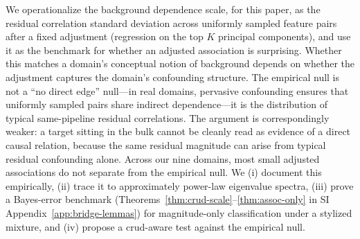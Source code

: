 We operationalize the background dependence scale, for this paper, as the residual correlation standard deviation across uniformly sampled feature pairs after a fixed adjustment (regression on the top $K$ principal components), and use it as the benchmark for whether an adjusted association is surprising. Whether this matches a domain's conceptual notion of background depends on whether the adjustment captures the domain's confounding structure. The empirical null is not a ``no direct edge'' null---in real domains, pervasive confounding ensures that uniformly sampled pairs share indirect dependence---it is the distribution of typical same-pipeline residual correlations. The argument is correspondingly weaker: a target sitting in the bulk cannot be cleanly read as evidence of a direct causal relation, because the same residual magnitude can arise from typical residual confounding alone. Across our nine domains, most small adjusted associations do not separate from the empirical null. We (i) document this empirically, (ii) trace it to approximately power-law eigenvalue spectra, (iii) prove a Bayes-error benchmark (Theorems~\ref{thm:crud-scale}--\ref{thm:assoc-only} in SI Appendix~\ref{app:bridge-lemmas}) for magnitude-only classification under a stylized mixture, and (iv) propose a crud-aware test against the empirical null.
